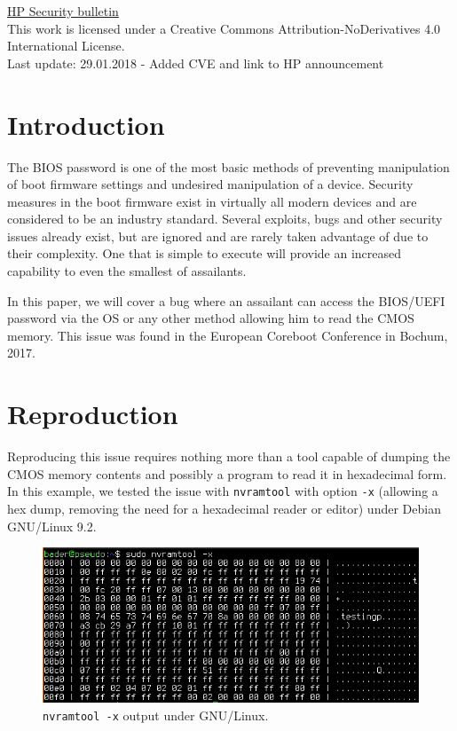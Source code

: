 \documentclass[a4paper,12pt]{article}
\begin{document}
\maketitle
\begin{center}
\small{\href{https://support.hp.com/us-en/document/c05913581}{HP Security bulletin}}
\\\small{This work is licensed under a Creative Commons Attribution-NoDerivatives 4.0 International License.}
\\\small{Last update: 29.01.2018 - Added CVE and link to HP announcement}
\end{center}
\section{Introduction}
The BIOS password is one of the most basic methods of preventing manipulation of boot firmware settings and undesired manipulation of a device. Security measures in the boot firmware exist in virtually all modern devices and are considered to be an industry standard. Several exploits, bugs and other security issues already exist, but are ignored and are rarely taken advantage of due to their complexity. One that is simple to execute will provide an increased capability to even the smallest of assailants.


In this paper, we will cover a bug where an assailant can access the BIOS/UEFI password via the OS or any other method allowing him to read the CMOS memory. This issue was found in the European Coreboot Conference in Bochum, 2017.

\section{Reproduction}

Reproducing this issue requires nothing more than a tool capable of dumping the CMOS memory contents and possibly a program to read it in hexadecimal form. In this example, we tested the issue with \texttt{nvramtool} with option \texttt{-x} (allowing a hex dump, removing the need for a hexadecimal reader or editor) under Debian GNU/Linux 9.2. 

\begin{figure}[ht!]
	\centering
	\includegraphics[width=120mm]{image.png}
	\caption{\texttt{nvramtool -x} output under GNU/Linux. \label{screenshot}}
\end{figure}
\end{document}
